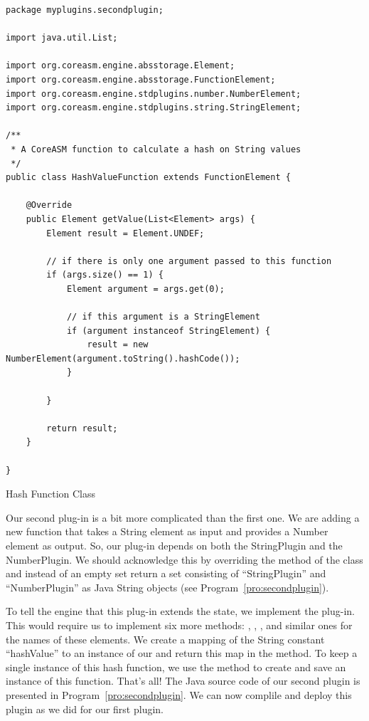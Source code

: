 \documentclass{article}
\begin{document}
\begin{program}
\small
\begin{verbatim}
package myplugins.secondplugin;

import java.util.List;

import org.coreasm.engine.absstorage.Element;
import org.coreasm.engine.absstorage.FunctionElement;
import org.coreasm.engine.stdplugins.number.NumberElement;
import org.coreasm.engine.stdplugins.string.StringElement;

/** 
 * A CoreASM function to calculate a hash on String values
 */
public class HashValueFunction extends FunctionElement {

    @Override
    public Element getValue(List<Element> args) {
        Element result = Element.UNDEF;
        
        // if there is only one argument passed to this function
        if (args.size() == 1) { 
            Element argument = args.get(0);
            
            // if this argument is a StringElement
            if (argument instanceof StringElement) {
                result = new NumberElement(argument.toString().hashCode());
            }
            
        }
        
        return result;
    }

}
\end{verbatim}
\caption{Hash Function Class}
\label{pro:hashfunction}
\end{program}

Our second plug-in is a bit more complicated than the first one. We are adding a new function that
takes a String element as input and provides a Number element as output. So, our plug-in depends on 
both the StringPlugin and the NumberPlugin. We should acknowledge this by overriding the 
method of the  class and instead of an empty set return a set consisting of ``StringPlugin'' 
and ``NumberPlugin'' as Java String objects (see Program~\ref{pro:secondplugin}).  

To tell the engine that this plug-in extends the \CoreASM state, we implement the 
plug-in. This would require us to implement six more methods: , , , 
and similar ones for the names of these elements. We create a mapping of the String constant ``hashValue'' to an instance of 
our  and return this map in the  method. To keep a single instance of
this hash function, we use the  method to create and save an instance of this function.
That's all! The Java source code of our second plugin is presented in Program~\ref{pro:secondplugin}. 
We can now complile and deploy this plugin as we did for our first plugin.
\end{document}
